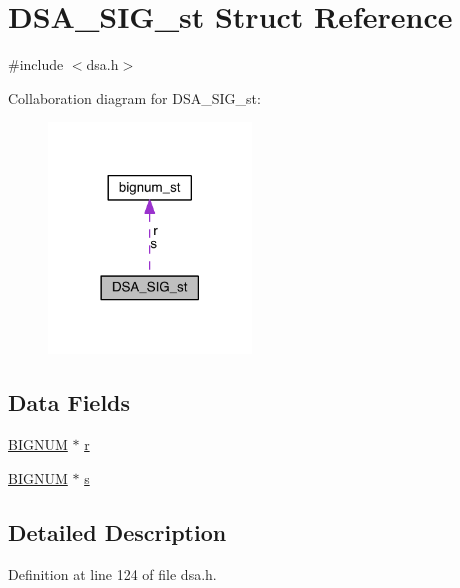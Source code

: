 \hypertarget{struct_d_s_a___s_i_g__st}{}\section{D\+S\+A\+\_\+\+S\+I\+G\+\_\+st Struct Reference}
\label{struct_d_s_a___s_i_g__st}


{\ttfamily \#include $<$dsa.\+h$>$}



Collaboration diagram for D\+S\+A\+\_\+\+S\+I\+G\+\_\+st\+:\nopagebreak
\begin{figure}[H]
\begin{center}
\leavevmode
\includegraphics[width=153pt]{struct_d_s_a___s_i_g__st__coll__graph}
\end{center}
\end{figure}
\subsection*{Data Fields}
\begin{DoxyCompactItemize}
\item 
\hyperlink{crypto_2ossl__typ_8h_a6fb19728907ec6515e4bfb716bffa141}{B\+I\+G\+N\+UM} $\ast$ \hyperlink{struct_d_s_a___s_i_g__st_acaf81cf110d1af000216b0bb5a57a919}{r}
\item 
\hyperlink{crypto_2ossl__typ_8h_a6fb19728907ec6515e4bfb716bffa141}{B\+I\+G\+N\+UM} $\ast$ \hyperlink{struct_d_s_a___s_i_g__st_ad4f6d96b398878d2c1dfc2b458a61b22}{s}
\end{DoxyCompactItemize}


\subsection{Detailed Description}


Definition at line 124 of file dsa.\+h.



